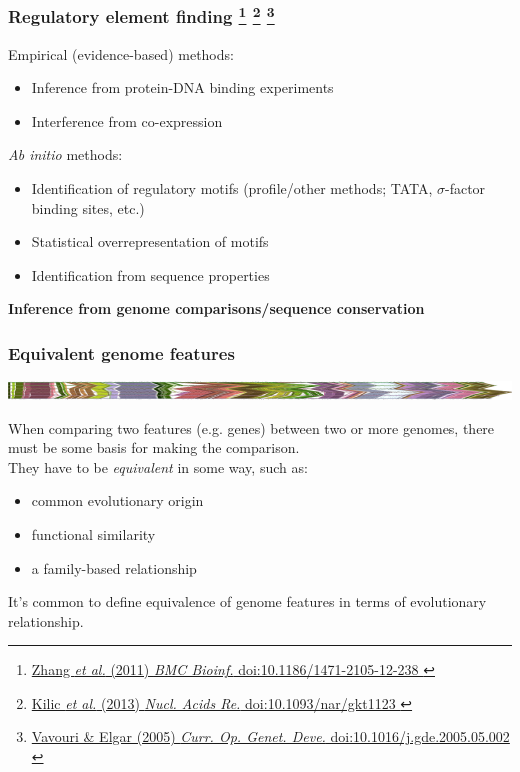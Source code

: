 %
\begin{frame}
  \frametitle{Regulatory element finding
  \footnote{\tiny{\href{http://dx.doi.org/10.1186/1471-2105-12-238
}{Zhang \textit{et al.} (2011) \textit{BMC Bioinf.} doi:10.1186/1471-2105-12-238
}}}
    \footnote{\tiny{\href{http://dx.doi.org/10.1093/nar/gkt1123
}{Kilic \textit{et al.} (2013) \textit{Nucl. Acids Re.} doi:10.1093/nar/gkt1123
}}}
    \footnote{\tiny{\href{http://dx.doi.org/10.1016/j.gde.2005.05.002
}{Vavouri \& Elgar (2005) \textit{Curr. Op. Genet. Deve.} doi:10.1016/j.gde.2005.05.002
}}}
    }
  \textcolor{hutton_green}{Empirical (evidence-based) methods:}
  \begin{itemize}
    \item Inference from protein-DNA binding experiments
    \item Interference from co-expression
  \end{itemize}
  \textcolor{hutton_blue}{\textit{Ab initio} methods:}
  \begin{itemize}
    \item Identification of regulatory motifs (profile/other methods; TATA, $\sigma$-factor binding sites, etc.)
    \item Statistical overrepresentation of motifs
    \item Identification from sequence properties
  \end{itemize}
  \textcolor{hutton_purple}{\textbf{Inference from genome comparisons/sequence conservation}}
\end{frame}

\begin{frame}
  \frametitle{Equivalent genome features}
  \begin{center}
    \includegraphics[width=1\textwidth]{images/collinear_zeae}  
  \end{center}
  When comparing two features (e.g. genes) between two or more genomes, there must be some basis for making the comparison. \\
  \textcolor{hutton_blue}{They have to be \textit{equivalent} in some way, such as:}
  \begin{itemize}
    \item common evolutionary origin
    \item functional similarity
    \item a family-based relationship
  \end{itemize}
  \textcolor{hutton_purple}{It's common to define equivalence of genome features in terms of evolutionary relationship.}
\end{frame}

